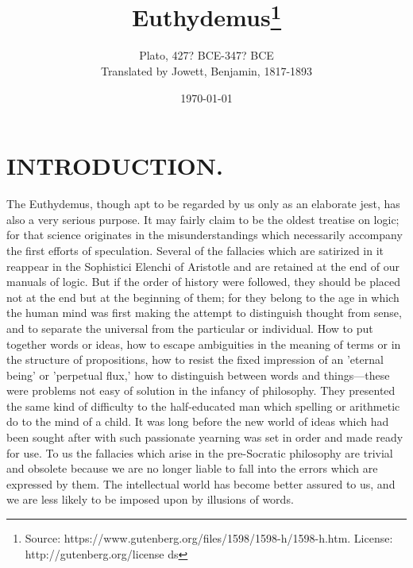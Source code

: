 \documentclass[11pt,letter]{article}
\begin{document}
\title{Euthydemus\thanks{Source: https://www.gutenberg.org/files/1598/1598-h/1598-h.htm. License: http://gutenberg.org/license ds}}
\date{\today}
\author{Plato, 427? BCE-347? BCE\\ Translated by Jowett, Benjamin, 1817-1893}
\maketitle

\setcounter{tocdepth}{1}
\tableofcontents
\renewcommand{\baselinestretch}{1.0}
\normalsize
\newpage

\section{
      INTRODUCTION.
    }
\par  The Euthydemus, though apt to be regarded by us only as an elaborate jest, has also a very serious purpose. It may fairly claim to be the oldest treatise on logic; for that science originates in the misunderstandings which necessarily accompany the first efforts of speculation. Several of the fallacies which are satirized in it reappear in the Sophistici Elenchi of Aristotle and are retained at the end of our manuals of logic. But if the order of history were followed, they should be placed not at the end but at the beginning of them; for they belong to the age in which the human mind was first making the attempt to distinguish thought from sense, and to separate the universal from the particular or individual. How to put together words or ideas, how to escape ambiguities in the meaning of terms or in the structure of propositions, how to resist the fixed impression of an 'eternal being' or 'perpetual flux,' how to distinguish between words and things—these were problems not easy of solution in the infancy of philosophy. They presented the same kind of difficulty to the half-educated man which spelling or arithmetic do to the mind of a child. It was long before the new world of ideas which had been sought after with such passionate yearning was set in order and made ready for use. To us the fallacies which arise in the pre-Socratic philosophy are trivial and obsolete because we are no longer liable to fall into the errors which are expressed by them. The intellectual world has become better assured to us, and we are less likely to be imposed upon by illusions of words.
\end{document}
